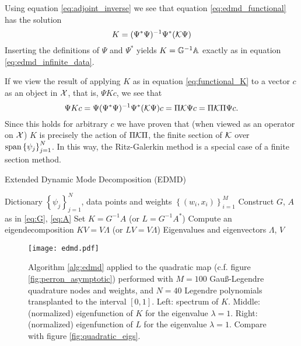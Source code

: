 Using equation \ref{eq:adjoint_inverse} we see that equation \ref{eq:edmd_functional} has 
the solution 
\begin{equation}
    \label{eq:functional_K}
    K = (\Psi^* \Psi)^{-1} \Psi^* (\mathcal{K} \Psi)
\end{equation}
Inserting the definitions of $\Psi$ and $\Psi^*$ yields $K = \mathbb{G}^{-1} \mathbb{A}$ exactly as 
in equation \ref{eq:edmd_infinite_data}. 

If we view the result of applying $K$ as in equation \ref{eq:functional_K} to a vector 
$c$ as an object in $\mathcal{X}$, that is, $\Psi K c$, we see that 
\begin{equation}
    \label{eq:PKP}
    \Psi K c = \Psi (\Psi^* \Psi)^{-1} \Psi^* (\mathcal{K} \Psi) c
    = \Pi \mathcal{K} \Psi c = \Pi \mathcal{K} \Pi \Psi c . 
\end{equation}
Since this holds for arbitrary $c$ we have proven that (when viewed as an operator 
on $\mathcal{X}$) $K$ is precisely the action of $\Pi \mathcal{K} \Pi$, the finite section of $\mathcal{K}$ 
over $\text{span} \left\{ \psi_j \right\}_{j=1}^N$. In this way, the Ritz-Galerkin method 
is a special case of a finite section method. 

\begin{algorithm}
    \caption{Extended Dynamic Mode Decomposition (EDMD)}
    \label{alg:edmd}
    \begin{algorithmic}[1]
        \Require Dictionary $\left\{ \psi_j \right\}_{j=1}^N$, data points and weights 
            $\left\{ (w_i, x_i) \right\}_{i=1}^M$
        \State Construct $G$, $A$ as in \ref{eq:G}, \ref{eq:A}
        \State Set $K = G^{-1} A$ (or $L = G^{-1} A^*$)
        \State Compute an eigendecomposition $K V = V \Lambda$ (or $L V = V \Lambda$)
        \State \Return Eigenvalues and eigenvectors $\Lambda$, $V$
    \end{algorithmic}
\end{algorithm}

\begin{figure}
    \centering
    \texttt{[image: edmd.pdf]}
    \caption{
        Algorithm \ref{alg:edmd} applied to the quadratic map (c.f. figure 
        \ref{fig:perron_asymptotic}) performed with $M = 100$ Gauß-Legendre quadrature 
        nodes and weights, and $N = 40$ Legendre polynomials transplanted to the interval 
        $[0, 1]$. Left: spectrum of $K$. Middle: (normalized) eigenfunction of $K$ for 
        the eigenvalue $\lambda = 1$. Right: (normalized) eigenfunction of $L$ for the 
        eigenvalue $\lambda = 1$. Compare with figure \ref{fig:quadratic_eigs}. 
    }\label{fig:edmd}
\end{figure}

